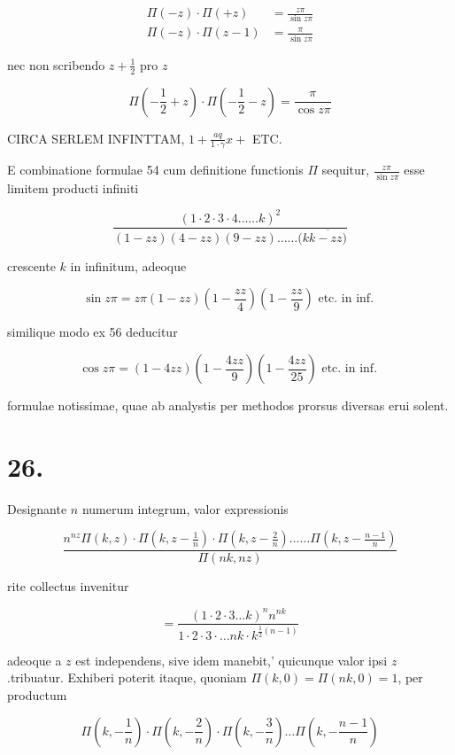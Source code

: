 \documentclass[10pt]{article}
\begin{document}
\[
\begin{aligned}
\Pi(-z) \cdot \Pi(+z) & =\frac{z \pi}{\sin z \pi} \\
\Pi(-z) \cdot \Pi(z-1) & =\frac{\pi}{\sin z \pi}
\end{aligned}
\]

nec non scribendo \(z+\frac{1}{2}\) pro \(z\)

\[
\Pi\left(-\frac{1}{2}+z\right) \cdot \Pi\left(-\frac{1}{2}-z\right)=\frac{\pi}{\cos z \pi}
\]

CIRCA SERLEM INFINTTAM, \(1+\frac{a q}{1 \cdot \gamma} x+\) ETC.

E combinatione formulae 54 cum definitione functionis \(\Pi\) sequitur, \(\frac{z \pi}{\sin z \pi}\) esse limitem producti infiniti

\[
\frac{(1 \cdot 2 \cdot 3 \cdot 4 \ldots \ldots k)^{2}}{(1-z z)(4-z z)(9-z z) \ldots \ldots(k \overline{k-z z)}}
\]

crescente \(k\) in infinitum, adeoque

\[
\sin z \pi=z \pi(1-z z)\left(1-\frac{z z}{4}\right)\left(1-\frac{z z}{9}\right) \text { etc. in inf. }
\]

similique modo ex 56 deducitur

\[
\cos z \pi=(1-4 z z)\left(1-\frac{4 z z}{9}\right)\left(1-\frac{4 z z}{25}\right) \text { etc. in inf. }
\]

formulae notissimae, quae ab analystis per methodos prorsus diversas erui solent.

\section*{26.}
Designante \(n\) numerum integrum, valor expressionis

\[
\frac{n^{n z} \Pi(k, z) \cdot \Pi\left(k, z-\frac{1}{n}\right) \cdot \Pi\left(k, z-\frac{2}{n}\right) \ldots \ldots \Pi\left(k, z-\frac{n-1}{n}\right)}{\Pi(n k, n z)}
\]

rite collectus invenitur

\[
=\frac{(1 \cdot 2 \cdot 3 \ldots k)^{n} n^{n k}}{1 \cdot 2 \cdot 3 \cdot \ldots n k \cdot k^{\frac{1}{2}(n-1)}}
\]

adeoque a \(z\) est independens, sive idem manebit,' quicunque valor ipsi \(z\).tribuatur. Exhiberi poterit itaque, quoniam \(\Pi(k, 0)=\Pi(n k, 0)=1\), per productum

\[
\Pi\left(k,-\frac{1}{n}\right) \cdot \Pi\left(k,-\frac{2}{n}\right) \cdot \Pi\left(k,-\frac{3}{n}\right) \ldots \Pi\left(k,-\frac{n-1}{n}\right)
\]
\end{document}
